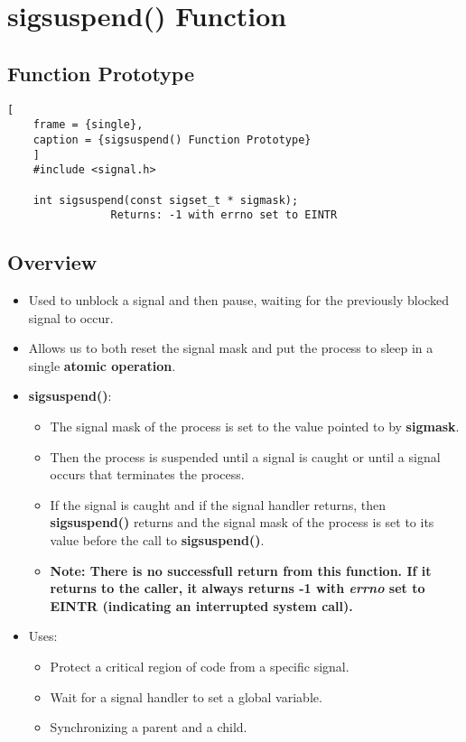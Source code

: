\documentclass{article}
\begin{document}
\section{\textbf{sigsuspend()} Function}
\subsection{Function Prototype}
\begin{lstlisting}[
    frame = {single},
    caption = {sigsuspend() Function Prototype}
    ]
    #include <signal.h>

    int sigsuspend(const sigset_t * sigmask);
                Returns: -1 with errno set to EINTR
\end{lstlisting}

\subsection{Overview}
\begin{itemize}
    \item Used to unblock a signal and then pause, waiting for the previously blocked signal to occur.
    \item Allows us to both reset the signal mask and put the process to sleep in a single \textbf{atomic operation}.

    \item \textbf{sigsuspend()}:
        \begin{itemize}
            \item The signal mask of the process is set to the value pointed to by \textbf{sigmask}.
            \item Then the process is suspended until a signal is caught or until a signal occurs that terminates the process.
            \item If the signal is caught and if the signal handler returns, then \textbf{sigsuspend()} returns and the signal mask of the process is set to its value before the call to \textbf{sigsuspend()}.
            \item \textbf{Note: There is no successfull return from this function. If it returns to the caller, it always returns -1 with \emph{errno} set to EINTR (indicating an interrupted system call).}
        \end{itemize}
    \item Uses:
        \begin{itemize}
            \item Protect a critical region of code from a specific signal.
            \item Wait for a signal handler to set a global variable.
            \item Synchronizing a parent and a child.
        \end{itemize}

\end{itemize}
\end{document}
